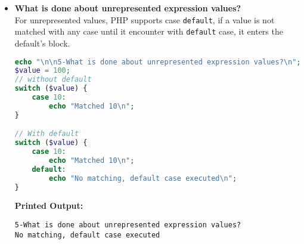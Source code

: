 \documentclass{article}
\begin{document}
\begin{itemize}
\begin{lstlisting}[language=PHP]
// Expressions
switch ($value) {
    case 2 + 1:
        echo "Matched 3 (2+1)\n";
        break;
    case 10 - 3:
        echo "Matched 7 (10-3)\n";
        break;
}

// Variables
$m = 2; $n = 3;
switch ($value) {
    case $m:
        echo "Matched m ($m)\n";
        break;
    case $m * $n:
        echo "Matched m * n ($m * $n)\n";
        break;
}

$value = "3";
switch ($value) {
    case 3:
        echo "Matched integer 3 with string '3' due to type coercion\n";
        break;
    case "3":
        echo "Matched string '3'\n";
        break;
}

// conditionals
$value = 6;
function isEven($num) {return $num % 2 == 0;}
switch ($value) {
    case isEven($value):
        echo "Matched condition (isEven(value))\n";
        break;
    case ($value > 4):
        echo "Matched condition (value > 4)\n";
        break;
    default:
        echo "No match\n";
}
\end{lstlisting}
\textbf{Printed Output:} 
\begin{verbatim}
4-How are case values specified?
Matched 3
Matched 3 (2+1)
Matched integer 3 with string '3' due to type coercion
Matched condition (isEven(value))
\end{verbatim}


\item \textbf{What is done about unrepresented expression values?} \\
For unrepresented values, PHP supports case \texttt{default}, if a value is not matched with any case until it encounter with \texttt{default} case, it enters the default's block.
\begin{lstlisting}[language=PHP]
echo "\n\n5-What is done about unrepresented expression values?\n";
$value = 100;
// without default
switch ($value) {
    case 10:
        echo "Matched 10\n";
}

// With default
switch ($value) {
    case 10:
        echo "Matched 10\n";
    default:
        echo "No matching, default case executed\n";
}
\end{lstlisting}
\textbf{Printed Output:} \begin{verbatim}
5-What is done about unrepresented expression values?
No matching, default case executed
\end{verbatim}

\end{itemize}
\newpage
\end{document}
